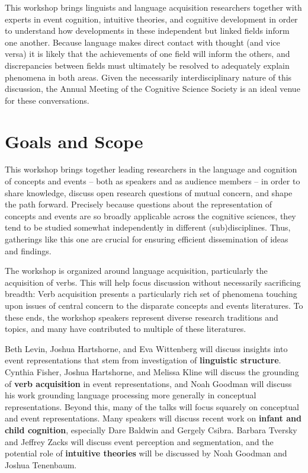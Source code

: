 \documentclass[10pt,letterpaper]{article}
\begin{document}
This workshop brings linguists and language acquisition researchers
together with experts in event cognition, intuitive theories, and
cognitive development in order to understand how
developments in these independent but linked fields inform one
another. Because language makes direct contact with thought (and vice versa) it is likely that the achievements of one
field will inform the others, and discrepancies between fields must ultimately be resolved to adequately explain phenomena in both areas. Given
the necessarily interdisciplinary nature of this discussion, the Annual
Meeting of the Cognitive Science Society is an ideal venue for these conversations.

\section{Goals and Scope}

This workshop brings together leading researchers in the language and
cognition of concepts and events -- both as speakers and as audience
members -- in order to share knowledge, discuss open research
questions of mutual concern, and shape the path forward. Precisely
because questions about the representation of concepts and events are
so broadly applicable across the cognitive sciences, they tend to be
studied somewhat independently in different (sub)disciplines. Thus,
gatherings like this one are crucial for ensuring efficient
dissemination of ideas and findings.

The workshop is organized around language acquisition, particularly
the acquisition of verbs. This will help focus discussion without
necessarily sacrificing breadth: Verb acquisition presents a
particularly rich set of phenomena touching upon issues of central
concern to the disparate concepts and events literatures. To these ends, the workshop speakers represent diverse research
traditions and topics, and many have contributed to multiple of these literatures.

Beth Levin, Joshua Hartshorne, and Eva Wittenberg will discuss insights into event
representations that stem from investigation of \textbf{linguistic structure}. Cynthia Fisher, Joshua Hartshorne, and
Melissa Kline will discuss the grounding of \textbf{verb acquisition} in event representations, and Noah Goodman
will discuss his work grounding language processing more generally in
conceptual representations. Beyond this, many of the talks will focus squarely on {conceptual and event representations}. Many speakers
will discuss recent work on \textbf{infant and child cognition}, especially Dare Baldwin and
Gergely Csibra. Barbara Tversky and Jeffrey Zacks will discuss event
perception and segmentation, and the potential role of
\textbf{intuitive theories} will be discussed by Noah Goodman and
Joshua Tenenbaum.
\end{document}
